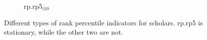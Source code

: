\begin{refsection}
\begin{figure}[h!]
\begin{subfigure}[b]{0.48\textwidth}
         \caption{rp.rp5$_{i10}$}
     \end{subfigure}
    \caption{Different types of rank percentile indicators for scholars. rp.rp5 is stationary, while the other two are not.}
    \label{fig:compare_autrp}
\end{figure}

\fi
\end{refsection}